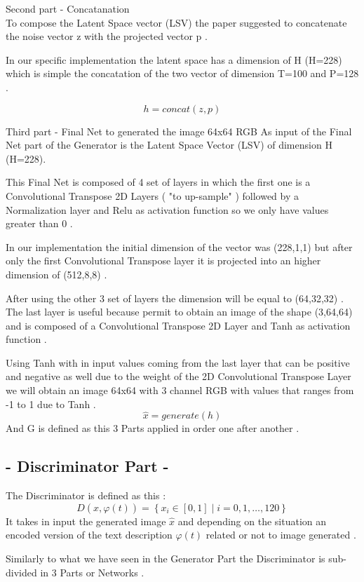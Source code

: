 Second part - Concatanation \\
To compose the Latent Space vector (LSV) the paper suggested to concatenate 
the noise vector z with the projected vector p .

In our specific implementation the latent space has a dimension of H (H=228)
which is simple the concatation of the two vector of dimension T=100 
and P=128 .

\[
h = concat( z , p )
\]

Third part - Final Net to generated the image 64x64 RGB 
As input of the Final Net part of the Generator is the Latent Space Vector 
(LSV) of dimension H (H=228). 

This Final Net is composed of 4 set of layers in which the first one is a 
Convolutional Transpose 2D Layers ( "to up-sample" ) followed by a Normalization layer 
and Relu as activation function so we only have values greater than 0 .

In our implementation the initial dimension of the vector was (228,1,1) but 
after only the first Convolutional Transpose layer it is projected into an higher dimension of 
(512,8,8) .

After using the other 3 set of layers the dimension will be equal to (64,32,32) .
The last layer is useful because permit to obtain an image of the shape 
(3,64,64) and is composed of a Convolutional Transpose 2D Layer and Tanh as activation function .

Using Tanh with in input values coming from the last layer that can be positive and 
negative as well due to the weight of the 2D Convolutional Transpose Layer we will obtain an 
image 64x64 with 3 channel RGB with values that ranges from -1 to 1 due to Tanh .
\[
\hat{x} = generate( h )
\]
And G is defined as this 3 Parts applied in order one after another  . 


\subsection*{- Discriminator Part -}
The Discriminator is defined as this :
\[
D ( \hat{x} , \varphi(t) ) = \left\{ x_i \in [0, 1] \mid i = 0, 1, \dots, 120 \right\}
\]
It takes in input the generated image $\hat{x}$ and depending
on the situation an encoded version of the text description $\varphi(t)$
related or not to image generated .

Similarly to what we have seen in the Generator Part the Discriminator is 
sub-divided in 3 Parts or Networks . 

